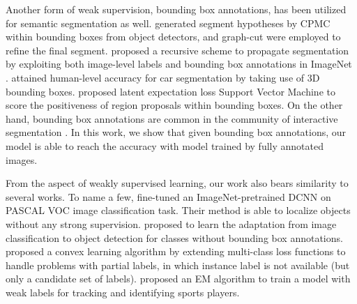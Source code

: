 Another form of weak supervision, bounding box annotations, has been utilized for semantic segmentation as well. \citet{xia2013semantic} generated segment hypotheses by CPMC \citep{carreira2012cpmc} within bounding boxes from object detectors, and graph-cut were employed to refine the final segment. \citet{guillaumin2014imagenet} proposed a recursive scheme to propagate segmentation by exploiting both image-level labels and bounding box annotations in ImageNet \citep{deng2009imagenet}. \citet{chen2014beat} attained human-level accuracy for car segmentation by taking use of 3D bounding boxes. \citet{zhu2014learning} proposed latent expectation loss Support Vector Machine to score the positiveness of region proposals within bounding boxes. On the other hand, bounding box annotations are common in the community of interactive segmentation \citep{lempitsky2009image, rother2004grabcut, WuMilcut}. In this work, we show that given bounding box annotations, our model is able to reach the accuracy with model trained by fully annotated images.

From the aspect of weakly supervised learning, our work also bears similarity to several works. To name a few, \citet{oquab2014weakly} fine-tuned an ImageNet-pretrained DCNN on PASCAL VOC image classification task. Their method is able to localize objects without any strong supervision. \citet{Hoffman14Lsda} proposed to learn the adaptation from image classification to object detection for classes without bounding box annotations. \citet{cour2011learning} proposed a convex learning algorithm by extending multi-class loss functions to handle problems with partial labels, in which instance label is not available (but only a candidate set of labels). \citet{Lu2013} proposed an EM algorithm to train a model with weak labels for tracking and identifying sports players.
